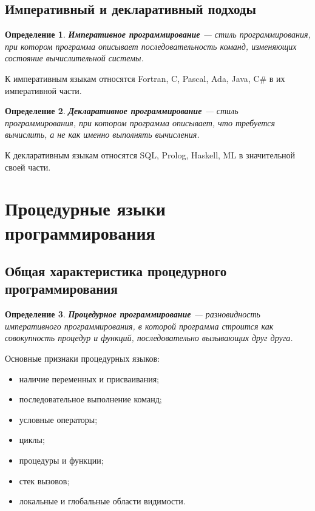 \documentclass[12pt,a4paper]{article}
\newtheorem{definition}{Определение}
\begin{document}
\subsection{Императивный и декларативный подходы}

\begin{definition}
\textbf{Императивное программирование} --- стиль программирования, при котором программа описывает последовательность команд, изменяющих состояние вычислительной системы.
\end{definition}

К императивным языкам относятся Fortran, C, Pascal, Ada, Java, C\# в их императивной части.

\begin{definition}
\textbf{Декларативное программирование} --- стиль программирования, при котором программа описывает, \emph{что} требуется вычислить, а не \emph{как именно} выполнять вычисления.
\end{definition}

К декларативным языкам относятся SQL, Prolog, Haskell, ML в значительной своей части.

\section{Процедурные языки программирования}

\subsection{Общая характеристика процедурного программирования}

\begin{definition}
\textbf{Процедурное программирование} --- разновидность императивного программирования, в которой программа строится как совокупность процедур и функций, последовательно вызывающих друг друга.
\end{definition}

Основные признаки процедурных языков:
\begin{itemize}
    \item наличие переменных и присваивания;
    \item последовательное выполнение команд;
    \item условные операторы;
    \item циклы;
    \item процедуры и функции;
    \item стек вызовов;
    \item локальные и глобальные области видимости.
\end{itemize}
\end{document}
